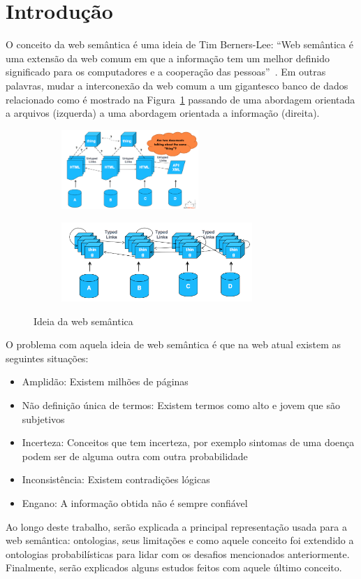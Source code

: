 \section{Introdução}
\label{sec:introduction}

O conceito da web semântica é uma ideia de Tim Berners-Lee: ``Web semântica é uma extensão da web comum em que a informação tem um melhor definido significado para os computadores e a cooperação das pessoas''~\cite{BernersLee01}. Em outras palavras, mudar a interconexão da web comum a um gigantesco banco de dados relacionado como é mostrado na Figura~\ref{fig:semantic_web} passando de uma abordagem orientada a arquivos (izquerda) a uma abordagem orientada a informação (direita).

\begin{figure}[H]
	\centering
	\begin{subfigure}{.45\textwidth}
		\centering
		\includegraphics[height=3cm]{images/documentweb}
	\end{subfigure}
	\begin{subfigure}{.45\textwidth}
		\centering
		\includegraphics[height=3cm]{images/dataweb}
	\end{subfigure}
	\caption{Ideia da web semântica}
	\label{fig:semantic_web}
\end{figure}

O problema com aquela ideia de web semântica é que na web atual existem as seguintes situações:
\begin{itemize}
	\item Amplidão: Existem milhões de páginas
	\item Não definição única de termos: Existem termos como alto e jovem que são subjetivos
	\item Incerteza: Conceitos que tem incerteza, por exemplo sintomas de uma doença podem ser de alguma outra com outra probabilidade
	\item Inconsistência: Existem contradições lógicas
	\item Engano: A informação obtida não é sempre confiável
\end{itemize}

Ao longo deste trabalho, serão explicada a principal representação usada para a web semântica: ontologias, seus limitações e como aquele conceito foi extendido a ontologias probabilísticas para lidar com os desafios mencionados anteriormente. Finalmente, serão explicados alguns estudos feitos com aquele último conceito.